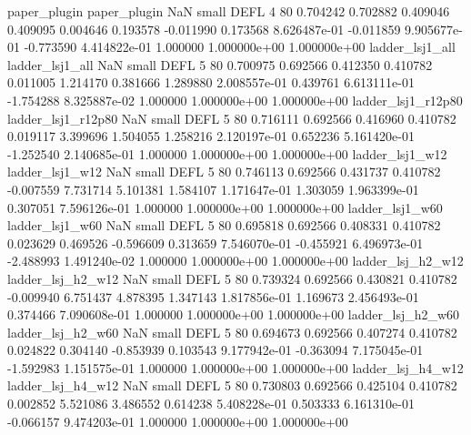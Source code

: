             paper_plugin             paper_plugin                   NaN      small     DEFL                 4 80 0.704242       0.702882 0.409046       0.409095    0.004646      0.193578     -0.011990     0.173568   8.626487e-01 -0.011859 9.905677e-01    -0.773590   4.414822e-01            1.000000    1.000000e+00        1.000000e+00
         ladder_lsj1_all          ladder_lsj1_all                   NaN      small     DEFL                 5 80 0.700975       0.692566 0.412350       0.410782    0.011005      1.214170      0.381666     1.289880   2.008557e-01  0.439761 6.613111e-01    -1.754288   8.325887e-02            1.000000    1.000000e+00        1.000000e+00
      ladder_lsj1_r12p80       ladder_lsj1_r12p80                   NaN      small     DEFL                 5 80 0.716111       0.692566 0.416960       0.410782    0.019117      3.399696      1.504055     1.258216   2.120197e-01  0.652236 5.161420e-01    -1.252540   2.140685e-01            1.000000    1.000000e+00        1.000000e+00
         ladder_lsj1_w12          ladder_lsj1_w12                   NaN      small     DEFL                 5 80 0.746113       0.692566 0.431737       0.410782   -0.007559      7.731714      5.101381     1.584107   1.171647e-01  1.303059 1.963399e-01     0.307051   7.596126e-01            1.000000    1.000000e+00        1.000000e+00
         ladder_lsj1_w60          ladder_lsj1_w60                   NaN      small     DEFL                 5 80 0.695818       0.692566 0.408331       0.410782    0.023629      0.469526     -0.596609     0.313659   7.546070e-01 -0.455921 6.496973e-01    -2.488993   1.491240e-02            1.000000    1.000000e+00        1.000000e+00
       ladder_lsj_h2_w12        ladder_lsj_h2_w12                   NaN      small     DEFL                 5 80 0.739324       0.692566 0.430821       0.410782   -0.009940      6.751437      4.878395     1.347143   1.817856e-01  1.169673 2.456493e-01     0.374466   7.090608e-01            1.000000    1.000000e+00        1.000000e+00
       ladder_lsj_h2_w60        ladder_lsj_h2_w60                   NaN      small     DEFL                 5 80 0.694673       0.692566 0.407274       0.410782    0.024822      0.304140     -0.853939     0.103543   9.177942e-01 -0.363094 7.175045e-01    -1.592983   1.151575e-01            1.000000    1.000000e+00        1.000000e+00
       ladder_lsj_h4_w12        ladder_lsj_h4_w12                   NaN      small     DEFL                 5 80 0.730803       0.692566 0.425104       0.410782    0.002852      5.521086      3.486552     0.614238   5.408228e-01  0.503333 6.161310e-01    -0.066157   9.474203e-01            1.000000    1.000000e+00        1.000000e+00
